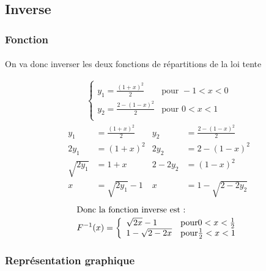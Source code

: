 \documentclass{article}
\begin{document}
\paragraph{}

\subsection{Inverse}

\subsubsection{Fonction}
\paragraph{} On va donc inverser les deux fonctions de répartitions de la loi tente%

\begin{align}
\left\{
	\begin{array}{ll}
		y_1=\frac{(1+x)^2}{2} &\mbox{pour } -1<x<0\\
		y_2=\frac{2-(1-x)^2}{2} &\mbox{pour } 0<x<1\\
	\end{array}
\right.
\end{align}
\begin{align}
y_1 & =\frac{(1+x)^2}{2} & y_2 & = \frac{2-(1-x)^2}{2} \\
2y_1 & = (1+x)^2 & 2y_2 & = 2 - (1-x)^2 \\
\sqrt{2y_1} & = 1+x & 2-2y_2 & = (1-x)^2 \\
x & = \sqrt{2y_1} - 1 & x & = 1- \sqrt{ 2-2y_2}
\end{align}
\begin{align}
\intertext{Donc la fonction inverse est :}
F^{-1}(x)=\left\{
		\begin{array}{ll}
			\sqrt{2x}-1 & \mbox{pour} 0<x<\frac{1}{2} \\
			1-\sqrt{2-2x} & \mbox{pour} \frac{1}{2}<x<1
		\end{array}
\right.
\end{align}


\subsubsection{Représentation graphique}
\begin{center}
\end{center}
\end{document}
